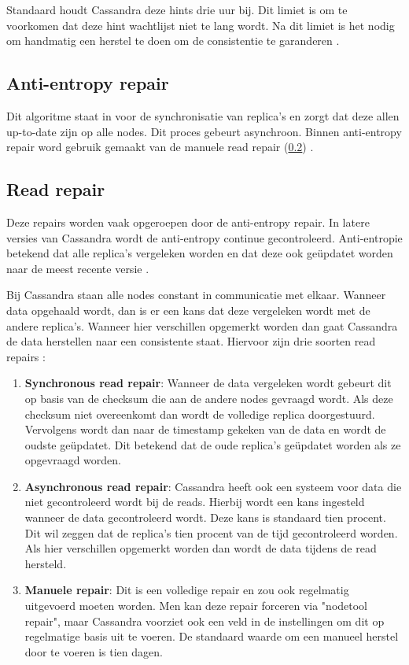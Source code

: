 Standaard houdt Cassandra deze hints drie uur bij.
Dit limiet is om te voorkomen dat deze hint wachtlijst niet te lang wordt.
Na dit limiet is het nodig om handmatig een herstel te doen om de consistentie te garanderen \citep{strickland2014availability}.

\subsection{Anti-entropy repair}
Dit algoritme staat in voor de synchronisatie van replica's en zorgt dat deze allen up-to-date zijn op alle nodes.
Dit proces gebeurt asynchroon.
Binnen anti-entropy repair word gebruik gemaakt van de manuele read repair (\ref{sec:read_repair}) \citep{strickland2014availability}.

\subsection{Read repair}
\label{sec:read_repair}
Deze repairs worden vaak opgeroepen door de anti-entropy repair.
In latere versies van Cassandra wordt de anti-entropy continue gecontroleerd.
Anti-entropie betekend dat alle replica's vergeleken worden en dat deze ook geüpdatet worden naar de meest recente versie \citep{Kunz2013Entropy}.

Bij Cassandra staan alle nodes constant in communicatie met elkaar.
Wanneer data opgehaald wordt, dan is er een kans dat deze vergeleken wordt met de andere replica's.
Wanneer hier verschillen opgemerkt worden dan gaat Cassandra de data herstellen naar een consistente staat.
Hiervoor zijn drie soorten read repairs \citep{strickland2014availability}:

\begin{enumerate}
	\item \textbf{Synchronous read repair}:
	Wanneer de data vergeleken wordt gebeurt dit op basis van de checksum die aan de andere nodes gevraagd wordt.
	Als deze checksum niet overeenkomt dan wordt de volledige replica doorgestuurd.
	Vervolgens wordt dan naar de timestamp gekeken van de data en wordt de oudste geüpdatet.
	Dit betekend dat de oude replica's geüpdatet worden als ze opgevraagd worden.
	
	\item \textbf{Asynchronous read repair}:
	Cassandra heeft ook een systeem voor data die niet gecontroleerd wordt bij de reads.
	Hierbij wordt een kans ingesteld wanneer de data gecontroleerd wordt.
	Deze kans is standaard tien procent.
	Dit wil zeggen dat de replica's tien procent van de tijd gecontroleerd worden.
	Als hier verschillen opgemerkt worden dan wordt de data tijdens de read hersteld.
	
	\item \textbf{Manuele repair}:
	Dit is een volledige repair en zou ook regelmatig uitgevoerd moeten worden.
	Men kan deze repair forceren via "nodetool repair", maar Cassandra voorziet ook een veld in de instellingen om dit op regelmatige basis uit te voeren.
	De standaard waarde om een manueel herstel door te voeren is tien dagen.
\end{enumerate}

